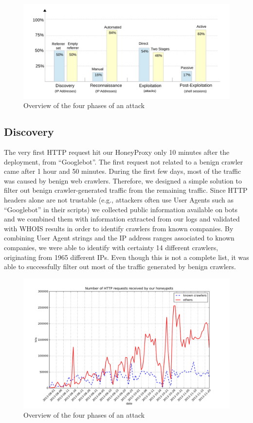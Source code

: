 \begin{figure}[tbh]
\centerline{\includegraphics[scale=0.4]{Images/overview_phases.jpg}}
\caption{Overview of the four phases of an attack\label{fig:overview_phases}}
\end{figure}

\subsection{Discovery}
The very first HTTP request hit our HoneyProxy only 10 minutes after the deployment, from ``Googlebot''. The first request not related to a benign crawler came after 1 hour and 50 minutes.
During the first few days, most of the traffic was caused by benign web crawlers. Therefore, we designed a simple solution to filter out benign crawler-generated traffic from the remaining traffic. Since HTTP headers alone are not trustable (e.g., attackers often use User Agents such as ``Googlebot'' in their scripts) we collected public information available on bots and we combined them with information extracted from our logs and validated with WHOIS results in order to identify crawlers from known companies. By combining User Agent strings and the IP address ranges associated to known companies, we were able to identify with certainty 14 different crawlers, originating from 1965 different IPs. Even though this is not a complete list, it was able to successfully filter out most of the traffic generated by benign crawlers.

\begin{figure}[tbh]
\centerline{\includegraphics[scale=0.4]{Images/requestsCrawlers.png}}
\caption{Overview of the four phases of an attack\label{fig:requestsCrawlers}}
\end{figure}

